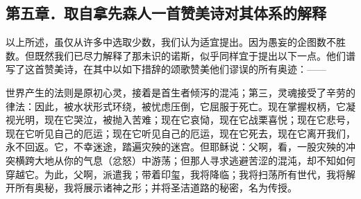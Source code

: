
\subsection{第五章．取自拿先森人一首赞美诗对其体系的解释}

以上所述，虽仅从许多中选取少数，我们认为适宜提出。因为愚妄的企图数不胜数。但既然我们已尽力解释了那未识的诺斯，似乎同样宜于提出以下一点。他们谱写了这首赞美诗，在其中以如下措辞的颂歌赞美他们谬误的所有奥迹：——\par

世界产生的法则是原初心灵，\newline{}接着是首生者倾泻的混沌；\newline{}第三，灵魂接受了辛劳的律法：\newline{}因此，被水状形式环绕，\newline{}被忧虑压倒，它屈服于死亡。\newline{}现在掌握权柄，它凝视光明，\newline{}现在它哭泣，被抛入苦难；\newline{}现在它哀恸，现在它战栗喜悦；\newline{}现在它悲号，现在它听见自己的厄运；\newline{}现在它听见自己的厄运，现在它死去，\newline{}现在它离开我们，永不回返。\newline{}它，不幸迷途，踏遍灾殃的迷宫。\newline{}但耶稣说：父啊，看，\newline{}一股灾殃的冲突横跨大地\newline{}从你的气息（忿怒）中游荡；\newline{}但那人寻求逃避苦涩的混沌，\newline{}却不知如何穿越它。\newline{}为此，父啊，派遣我；\newline{}带着印玺，我将降临；\newline{}我将扫荡所有世代，\newline{}我将解开所有奥秘，\newline{}我将展示诸神之形；\newline{}并将圣洁道路的秘密，\newline{}名为传授。\par


